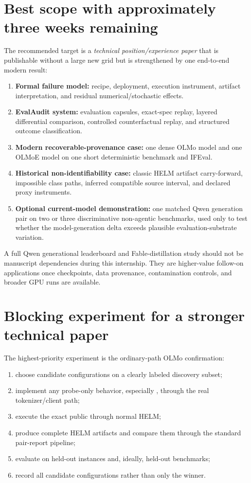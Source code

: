 \documentclass[11pt,oneside]{report}
\newcommand{\code}[1]{\texttt{\detokenize{#1}}}
\begin{document}
\section{Best scope with approximately three weeks remaining}

The recommended target is a \emph{technical position/experience paper} that is publishable without a large new grid but is strengthened by one end-to-end modern result:

\begin{enumerate}
  \item \textbf{Formal failure model:} recipe, deployment, execution instrument, artifact interpretation, and residual numerical/stochastic effects.
  \item \textbf{EvalAudit system:} evaluation capsules, exact-spec replay, layered differential comparison, controlled counterfactual replay, and structured outcome classification.
  \item \textbf{Modern recoverable-provenance case:} one dense OLMo model and one OLMoE model on one short deterministic benchmark and IFEval.
  \item \textbf{Historical non-identifiability case:} classic HELM artifact carry-forward, impossible class paths, inferred compatible source interval, and declared proxy instruments.
  \item \textbf{Optional current-model demonstration:} one matched Qwen generation pair on two or three discriminative non-agentic benchmarks, used only to test whether the model-generation delta exceeds plausible evaluation-substrate variation.
\end{enumerate}

A full Qwen generational leaderboard and Fable-distillation study should not be manuscript dependencies during this internship. They are higher-value follow-on applications once checkpoints, data provenance, contamination controls, and broader GPU runs are available.

\section{Blocking experiment for a stronger technical paper}

The highest-priority experiment is the ordinary-path OLMo confirmation:

\begin{enumerate}
  \item choose candidate configurations on a clearly labeled discovery subset;
  \item implement any probe-only behavior, especially \code{add_special_tokens=False}, through the real tokenizer/client path;
  \item execute the exact public \code{run_spec.json} through normal HELM;
  \item produce complete HELM artifacts and compare them through the standard pair-report pipeline;
  \item evaluate on held-out instances and, ideally, held-out benchmarks;
  \item record all candidate configurations rather than only the winner.
\end{enumerate}
\end{document}
